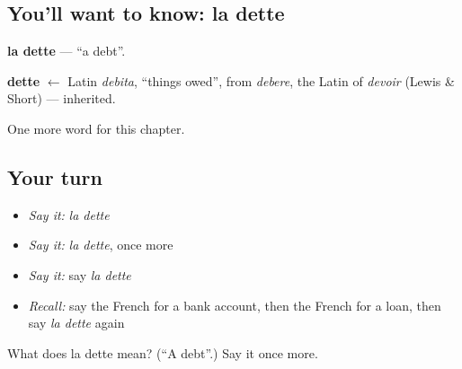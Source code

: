 \subsection*{You'll want to know: la dette}
\textbf{la dette} — \textquotedblleft{}a debt\textquotedblright{}.

\begin{cousinweb}
\textbf{dette} $\leftarrow$ Latin \emph{debita}, \textquotedblleft{}things owed\textquotedblright{}, from \emph{debere}, the Latin of \emph{devoir} (Lewis \& Short) — inherited.
\end{cousinweb}

\begin{grammarlens}[title={What you've built}]
One more word for this chapter.
\end{grammarlens}

\subsection*{Your turn}
\begin{itemize}
\raggedright
  \item \emph{Say it:} \emph{la dette}
  \item \emph{Say it:} \emph{la dette}, once more
  \item \emph{Say it:} say \emph{la dette}
  \item \emph{Recall:} say the French for a bank account, then the French for a loan, then say \emph{la dette} again
\end{itemize}

\begin{tcolorbox}[breakable,colback=teal!4,colframe=teal!35!black,title={Before you move on}]
What does la dette mean? (\textquotedblleft{}A debt\textquotedblright{}.) Say it once more.
\end{tcolorbox}
